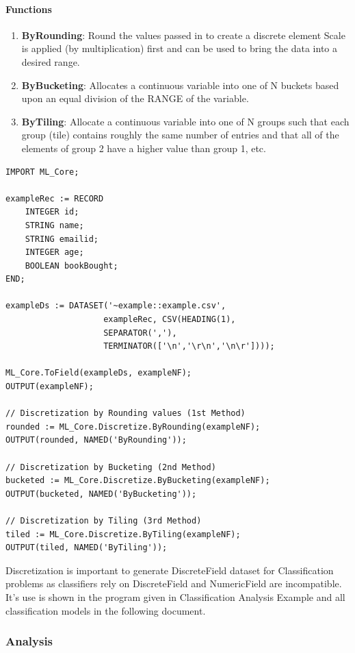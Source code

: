 \paragraph{Functions}

\begin{enumerate}
    \item \textbf{ByRounding}: Round the values passed in to create a discrete element Scale is applied (by multiplication) first and can be used to bring the data into a desired range.
    \item \textbf{ByBucketing}: Allocates a continuous variable into one of N buckets based upon an equal division of the RANGE of the variable.
    \item \textbf{ByTiling}: Allocate a continuous variable into one of N groups such that each group (tile) contains roughly the same number of entries and that all of the elements of group 2 have a higher value than group 1, etc.
\end{enumerate}

\begin{lstlisting}
IMPORT ML_Core;

exampleRec := RECORD
    INTEGER id;
    STRING name;
    STRING emailid;
    INTEGER age;
    BOOLEAN bookBought;
END;

exampleDs := DATASET('~example::example.csv', 
                    exampleRec, CSV(HEADING(1),
                    SEPARATOR(','),
                    TERMINATOR(['\n','\r\n','\n\r'])));

ML_Core.ToField(exampleDs, exampleNF);
OUTPUT(exampleNF);

// Discretization by Rounding values (1st Method)
rounded := ML_Core.Discretize.ByRounding(exampleNF);
OUTPUT(rounded, NAMED('ByRounding'));

// Discretization by Bucketing (2nd Method)
bucketed := ML_Core.Discretize.ByBucketing(exampleNF);
OUTPUT(bucketed, NAMED('ByBucketing'));

// Discretization by Tiling (3rd Method)
tiled := ML_Core.Discretize.ByTiling(exampleNF);
OUTPUT(tiled, NAMED('ByTiling'));
\end{lstlisting}

Discretization is important to generate DiscreteField dataset for Classification problems as classifiers rely on DiscreteField and NumericField are incompatible. It's use is shown in the program given in Classification Analysis Example and all classification models in the following document.

\subsubsection{Analysis}\label{mlcore:analysis}


